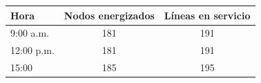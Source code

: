 \begin{tabular}{lcc}
\toprule
\textbf{Hora} & \textbf{Nodos energizados} & \textbf{Líneas en servicio} \\
\midrule
9:00 a.m. & 181 & 191 \\
12:00 p.m. & 181 & 191 \\
15:00 & 185 & 195 \\
\bottomrule
\end{tabular}
